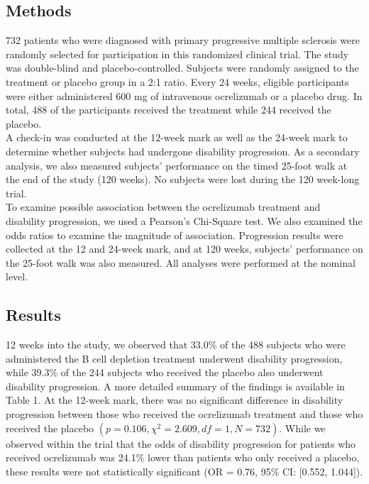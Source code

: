 \documentclass{article}
\begin{document}
	\subsection*{Methods}
	732 patients who were diagnosed with primary progressive multiple sclerosis were randomly selected for participation in this randomized clinical trial. The study was double-blind and placebo-controlled. Subjects were randomly assigned to the treatment or placebo group in a 2:1 ratio. Every 24 weeks, eligible participants were either administered 600 mg of intravenous ocrelizumab or a placebo drug. In total, 488 of the participants received the treatment while 244 received the placebo. \\


	A check-in was conducted at the 12-week mark as well as the 24-week mark to determine whether subjects had undergone disability progression. As a secondary analysis, we also measured subjects’ performance on the timed 25-foot walk at the end of the study (120 weeks). No subjects were lost during the 120 week-long trial. \\


	To examine possible association between the ocrelizumab treatment and disability progression, we used a Pearson’s Chi-Square test. We also examined the odds ratios to examine the magnitude of association. Progression results were collected at the 12 and 24-week mark, and at 120 weeks, subjects’ performance on the 25-foot walk was also measured. All analyses were performed at the nominal level.


	\subsection*{Results}
	12 weeks into the study, we observed that 33.0\% of the 488 subjects who were administered the B cell depletion treatment underwent disability progression, while 39.3\% of the 244 subjects who received the placebo also underwent disability progression. A more detailed summary of the findings is available in Table 1. At the 12-week mark, there was no significant difference in disability progression between those who received the ocrelizumab treatment and those who received the placebo $(p = 0.106, \chi^2 = 2.609, df = 1, N = 732)$. While we observed within the trial that the odds of disability progression for patients who received ocrelizumab was 24.1\% lower than patients who only received a placebo, these results were not statistically significant (OR = 0.76, 95\% CI: [0.552, 1.044]).
\end{document}
